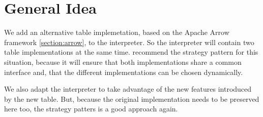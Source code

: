 %
%
%
%
%
%
%
%

\section{General Idea}
\label{section:General Idea}
We add an alternative table implemetation, based on the Apache Arrow framework \ref{section:arrow}, to the interpreter.
So the interpreter will contain two table implementations at the same time.
\textcite{Dooley2024} recommend the strategy pattern for this situation, because it will ensure that both implementations share a common interface and, that the different implementations can be chosen dynamically.

We also adapt the interpreter to take advantage of the new features introduced by the new table.
But, because the original implementation needs to be preserved here too, the strategy patters is a good approach again.

